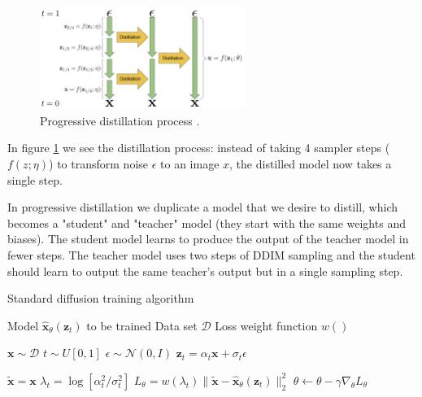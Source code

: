\begin{figure}
    \centering
    \includegraphics[width=0.6\textwidth]{images/imagen_video/v_prediction.png}
    \caption{Progressive distillation process \cite{v_prediction}.}
    \label{fig:progressive_distillation}
\end{figure}

In figure \ref{fig:progressive_distillation} we see the distillation process: instead of taking 4 sampler steps ($f(z; \eta)$) to transform noise $\epsilon$ to an image $x$, the distilled model now takes a single step.

In progressive distillation we duplicate a model that we desire to distill, which becomes a "student" and "teacher" model (they start with the same weights and biases). The student model learns to produce the output of the teacher model in fewer steps. The teacher model uses two steps of DDIM sampling and the student should learn to output the same teacher's output but in a single sampling step.




\begin{algorithm}[H]
    \centering
    \caption{Standard diffusion training algorithm \cite{v_prediction}}
    \label{alg:ddpm_training_before_distillation}
    \begin{algorithmic}
        \Require Model $\hat{\mathbf{x}}_{\theta}(\mathbf{z}_t)$ to be trained
        \Require Data set $\mathcal{D}$
        \Require Loss weight function $w()$
        
            \State $\mathbf{x} \sim \mathcal{D}$ 
            \State $t \sim U[0,1]$ 
            \State $\epsilon \sim \mathcal{N}(0, I)$ 
            \State $\mathbf{z}_t = \alpha_t \mathbf{x} + \sigma_t \epsilon$ 
            
            \State $\tilde{\mathbf{x}} = \mathbf{x}$ 
            \State $\lambda_t = \log[\alpha_t^2/\sigma_t^2]$ 
            \State $L_{\theta} = w(\lambda_t) \|\tilde{\mathbf{x}} - \hat{\mathbf{x}}_{\theta}(\mathbf{z}_t)\|_2^2$ 
            \State $\theta \gets \theta - \gamma \nabla_{\theta} L_{\theta}$ 
        \EndWhile
    \end{algorithmic}
\end{algorithm}


